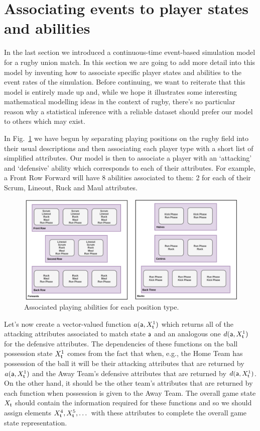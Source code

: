 \section{\sffamily Associating events to player states and abilities}

In the last section we introduced a continuous-time event-based simulation model for a rugby union match. In this section we are going to add more detail into this model by inventing how to associate specific player states and abilities to the event rates of the simulation. Before continuing, we want to reiterate that this model is entirely made up and, while we hope it illustrates some interesting mathematical modelling ideas in the context of rugby, there's no particular reason why a statistical inference with a reliable dataset should prefer our model to others which may exist.

In Fig.~\ref{fig:player-abilities} we have begun by separating playing positions on the rugby field into their usual descriptions and then associating each player type with a short list of simplified attributes. Our model is then to associate a player with an `attacking' and `defensive' ability which corresponds to each of their attributes. For example, a Front Row Forward will have 8 abilities associated to them: 2 for each of their {\sf Scrum}, {\sf Lineout}, {\sf Ruck} and {\sf Maul} attributes.

\begin{figure}[h]
\includegraphics[width=15cm]{images/rugby-player-abilities.drawio.png}
\caption{Associated playing abilities for each position type.}
\label{fig:player-abilities}
\end{figure}

Let's now create a vector-valued function $a({\sf a}, X^1_{\sf t})$ which returns all of the attacking attributes associated to match state ${\sf a}$ and an analogous one $d({\sf a}, X^1_{\sf t})$ for the defensive attributes. The dependencies of these functions on the ball possession state $X^1_{\sf t}$ comes from the fact that when, e.g., the {\sf Home Team} has possession of the ball it will be their attacking attributes that are returned by $a({\sf a}, X^1_{\sf t})$ and the {\sf Away Team}'s defensive attributes that are returned by $d({\sf a}, X^1_{\sf t})$. On the other hand, it should be the other team's attributes that are returned by each function when possession is given to the {\sf Away Team}. The overall game state $X_{{\sf t}}$ should contain the information required for these functions and so we should assign elements $X^4_{{\sf t}}, X^5_{{\sf t}}, \dots$ with these attributes to complete the overall game state representation.

